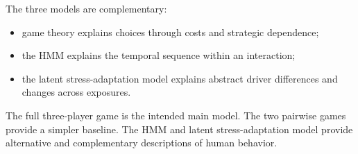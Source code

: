 \documentclass[11pt,a4paper]{article}
\begin{document}
The three models are complementary:

\begin{itemize}[noitemsep]
  \item game theory explains choices through costs and strategic dependence;
  \item the HMM explains the temporal sequence within an interaction;
  \item the latent stress-adaptation model explains abstract driver differences and changes across exposures.
\end{itemize}

The full three-player game is the intended main model. The two pairwise games provide a simpler baseline. The HMM and latent stress-adaptation model provide alternative and complementary descriptions of human behavior.
\end{document}
